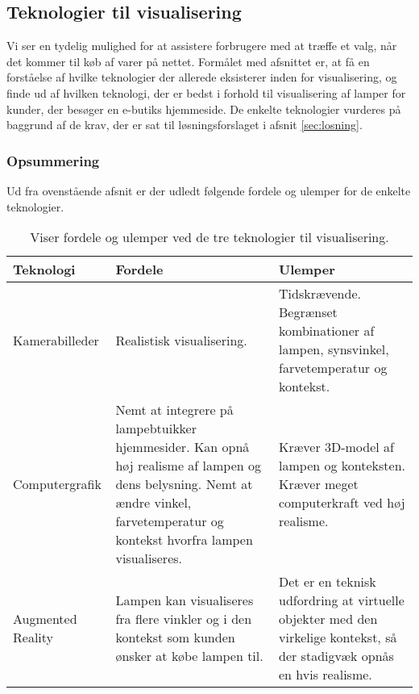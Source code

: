 \subsection{Teknologier til visualisering}
\label{sec:tek_til_visualisering}
Vi ser en tydelig mulighed for at assistere forbrugere med at træffe et valg, når det kommer til køb af varer på nettet. Formålet med afsnittet er, at få en forståelse af hvilke teknologier der allerede eksisterer inden for visualisering, og finde ud af hvilken teknologi, der er bedst i forhold til visualisering af lamper for kunder, der besøger en e-butiks hjemmeside. De enkelte teknologier vurderes på baggrund af de krav, der er sat til løsningsforslaget i afsnit \ref{sec:losning}.







\subsubsection*{Opsummering}
Ud fra ovenstående afsnit er der udledt følgende fordele og ulemper for de enkelte teknologier.
\begin{table}[H]
  \centering
  
\center
    \begin{tabular}{ | p{3cm} | p{5cm} | p{5cm} |}
    
    \hline
    Teknologi & Fordele & Ulemper \\ \hline
    Kamerabilleder & Realistisk visualisering. & Tidskrævende. Begrænset kombinationer af lampen, synsvinkel, farvetemperatur og kontekst. \\ \hline
   Computergrafik & Nemt at integrere på lampebtuikker hjemmesider. Kan opnå høj realisme af lampen og dens belysning. \newline Nemt at ændre vinkel, farvetemperatur og kontekst hvorfra lampen visualiseres. & Kræver 3D-model af lampen og konteksten. Kræver meget computerkraft ved høj realisme. \\ \hline
   Augmented Reality & Lampen kan visualiseres fra flere vinkler og i den kontekst som kunden ønsker at købe lampen til. & Det er en teknisk udfordring at virtuelle objekter med den virkelige kontekst, så der stadigvæk opnås en hvis realisme. \\ \hline
    \end{tabular}
  \caption{Viser fordele og ulemper ved de tre teknologier til visualisering.}
\label{tab:fordele_ulemper_teknologier}
\end{table}


